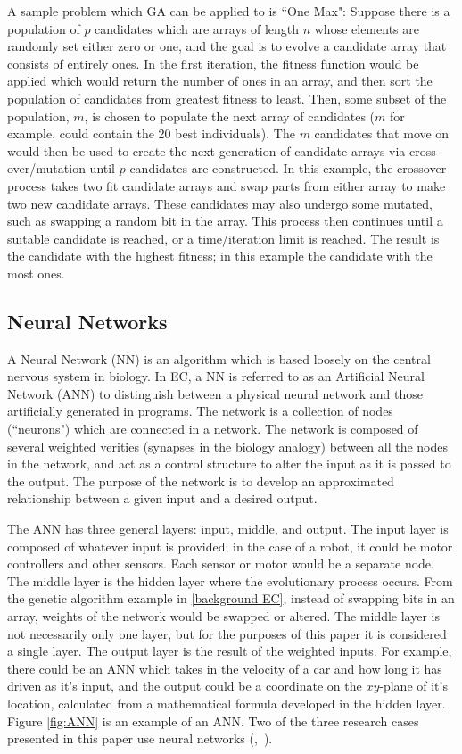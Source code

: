 \documentclass{sig-alternate}
\begin{document}
  A sample problem which GA can be applied to is ``One Max": Suppose there is a population of $p$ candidates which are arrays of length $n$ whose elements are randomly set either zero or one, and the goal is to evolve a candidate array that consists of entirely ones. In the first iteration, the fitness function would be applied which would return the number of ones in an array, and then sort the population of candidates from greatest fitness to least. Then, some subset of the population, $m$, is chosen to populate the next array of candidates ($m$ for example, could contain the 20 best individuals). The $m$ candidates that move on would then be used to create the next generation of candidate arrays via cross-over/mutation until $p$ candidates are constructed. In this example, the crossover process takes two fit candidate arrays and swap parts from either array to make two new candidate arrays. These candidates may also undergo some mutated, such as swapping a random bit in the array. This process then continues until a suitable candidate is reached, or a time/iteration limit is reached. The result is the candidate with the highest fitness; in this example the candidate with the most ones.
  
\subsection{Neural Networks}
	A Neural Network (NN) \cite{wiki:robotics} is an algorithm which is based loosely on the central nervous system in biology. In EC, a NN is referred to as an Artificial Neural Network (ANN) to distinguish between a physical neural network and those artificially generated in programs. The network is a collection of nodes (``neurons") which are connected in a network. The network is composed of several weighted verities (synapses in the biology analogy) between all the nodes in the network, and act as a control structure to alter the input as it is passed to the output. The purpose of the network is to develop an approximated relationship between a given input and a desired output.

	 The ANN has three general layers: input, middle, and output. The input layer is composed of whatever input is provided; in the case of a robot, it could be motor controllers and other sensors. Each sensor or motor would be a separate node. The middle layer is the hidden layer where the evolutionary process occurs. From the genetic algorithm example in \ref{background EC}, instead of swapping bits in an array, weights of the network would be swapped or altered. The middle layer is not necessarily only one layer, but for the purposes of this paper it is considered a single layer. The output layer is the result of the weighted inputs. For example, there could be an ANN which takes in the velocity of a car and how long it has driven as it's input, and the output could be a coordinate on the $xy$-plane of it's location, calculated from a mathematical formula developed in the hidden layer. Figure \ref{fig:ANN} is an example of an ANN. Two of the three research cases presented in this paper use neural networks (\cite{Moore:2013:ESK:2463372.2463402},~\cite{Pretorius:2009:TAN:1632149.1632171}).
  
\end{document}
